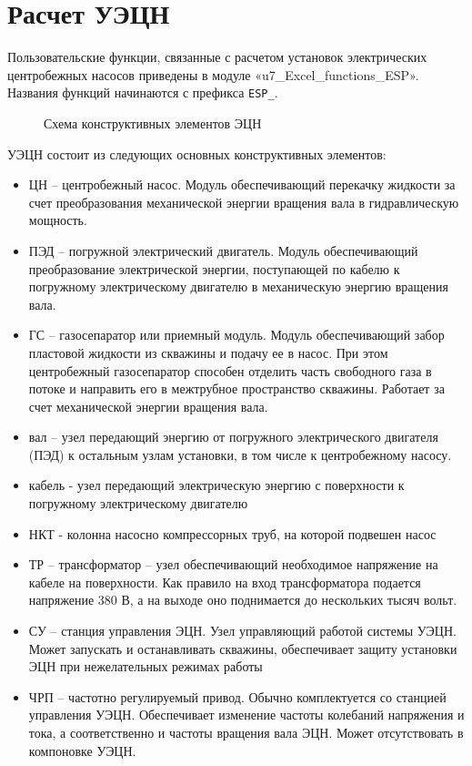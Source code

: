 \section{Расчет УЭЦН}
Пользовательские функции, связанные с расчетом установок электрических центробежных насосов приведены в модуле «u7\_Excel\_functions\_ESP».  Названия функций начинаются с префикса \texttt{ESP_}. 

\begin{figure}[h!]
	\begin{center}
		
		\caption{Схема конструктивных элементов ЭЦН}
		\label{ris:ESP_well_1}
	\end{center}
\end{figure}

УЭЦН состоит из следующих основных конструктивных элементов:
\begin{itemize}
	\item ЦН -- центробежный насос. Модуль обеспечивающий перекачку жидкости за счет преобразования механической энергии вращения вала в гидравлическую мощность. 
	\item ПЭД -- погружной электрический двигатель. Модуль обеспечивающий преобразование электрической энергии, поступающей по кабелю к погружному электрическому двигателю в механическую энергию вращения вала.
	\item ГС -- газосепаратор или приемный модуль. Модуль обеспечивающий забор пластовой жидкости из скважины и подачу ее в насос. При этом центробежный газосепаратор способен отделить часть свободного газа в потоке и направить его в межтрубное пространство скважины. Работает за счет механической энергии вращения вала.
	\item вал -- узел передающий энергию от погружного электрического двигателя (ПЭД) к остальным узлам установки, в том числе к центробежному насосу.
	\item кабель - узел передающий электрическую энергию с поверхности к погружному электрическому двигателю
	\item НКТ - колонна насосно компрессорных труб, на которой подвешен насос
	\item ТР -- трансформатор -- узел обеспечивающий необходимое напряжение на кабеле на поверхности. Как правило на вход трансформатора подается напряжение 380 В, а на выходе оно поднимается до нескольких тысяч вольт. 
	\item СУ -- станция управления ЭЦН. Узел управляющий работой системы УЭЦН. Может запускать и  останавливать скважины, обеспечивает защиту установки ЭЦН при нежелательных режимах работы
	\item ЧРП -- частотно регулируемый привод. Обычно комплектуется со станцией управления УЭЦН. Обеспечивает изменение частоты колебаний напряжения и тока, а соответственно и частоты вращения вала ЭЦН. Может отсутствовать в компоновке УЭЦН. 
\end{itemize}

